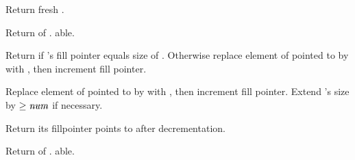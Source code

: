 \begin{LIST}{1cm}
  
  Return fresh .

  Return  of . able.

  Return \retval{\NIL} if 's fill pointer equals size of
  . Otherwise replace element of  pointed to
  by  with , then increment fill
  pointer. 

  Replace element of  pointed to by  with
  , then increment fill pointer. Extend 's size by
  $\ge \VAR{num}$ if necessary.

  Return  its fillpointer points to
  after decrementation.

  Return  of . able.

\end{LIST}


